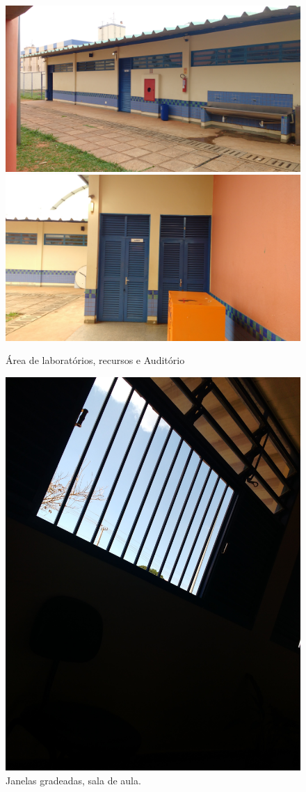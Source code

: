 \begin{figure}[!htpb]
\begin{center}
	\includegraphics[width=.6\textwidth]{imagens/IMG_20161018_162635672.jpg} \quad
	\includegraphics[width=.6\textwidth]{imagens/IMG_20161018_162545314.jpg}
\caption{Área de laboratórios, recursos e Auditório} \label{figura08}
\end{center}
\end{figure}

\begin{figure}[!htpb]
        \centering
        \includegraphics[width=.5\textwidth]{imagens/13-08-04_10-06-2016.jpg}
        \caption{Janelas gradeadas, sala de aula.}
        \label{figura03}
\end{figure}

